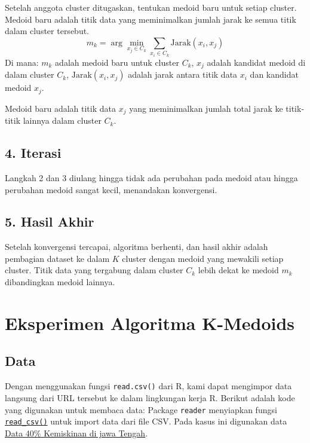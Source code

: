 \documentclass[
  oneside]{book}
\begin{document}
Setelah anggota cluster ditugaskan, tentukan medoid baru untuk setiap cluster. Medoid baru adalah titik data yang meminimalkan jumlah jarak ke semua titik dalam cluster tersebut.
\[
   m_k = \arg\min_{x_j \in C_k} \sum_{x_i \in C_k} \text{Jarak}(x_i, x_j)
   \]
Di mana: \(m_k\) adalah medoid baru untuk cluster \(C_k\), \(x_j\) adalah kandidat medoid di dalam cluster \(C_k\), \(\text{Jarak}(x_i, x_j)\) adalah jarak antara titik data \(x_i\) dan kandidat medoid \(x_j\).

Medoid baru adalah titik data \(x_j\) yang meminimalkan jumlah total jarak ke titik-titik lainnya dalam cluster \(C_k\).

\subsection*{4. Iterasi}\label{iterasi}

Langkah 2 dan 3 diulang hingga tidak ada perubahan pada medoid atau hingga perubahan medoid sangat kecil, menandakan konvergensi.

\subsection*{5. Hasil Akhir}\label{hasil-akhir-1}

Setelah konvergensi tercapai, algoritma berhenti, dan hasil akhir adalah pembagian dataset ke dalam \(K\) cluster dengan medoid yang mewakili setiap cluster. Titik data yang tergabung dalam cluster \(C_k\) lebih dekat ke medoid \(m_k\) dibandingkan medoid lainnya.

\section{Eksperimen Algoritma K-Medoids}\label{eksperimen-algoritma-k-medoids}

\subsection*{Data}\label{data-1}

Dengan menggunakan fungsi \texttt{read.csv()} dari R, kami dapat mengimpor data langsung dari URL tersebut ke dalam lingkungan kerja R. Berikut adalah kode yang digunakan untuk membaca data: Package \texttt{reader} menyiapkan fungsi \href{https://readr.tidyverse.org/reference/read_delim.html}{\texttt{read\_csv()}} untuk import data dari file CSV. Pada kasus ini digunakan data \href{https://github.com/dedenistiawan/Dataset/blob/main/BDT.csv}{Data 40\% Kemiskinan di jawa Tengah}.
\end{document}
